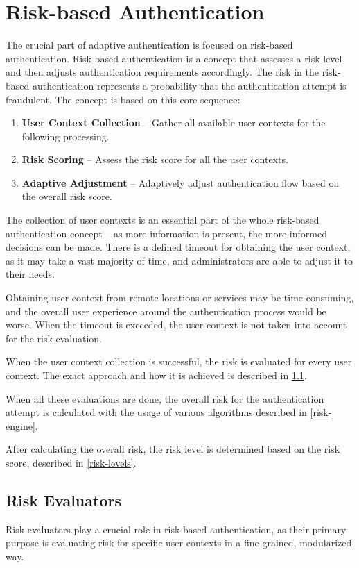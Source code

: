 \section{Risk-based Authentication}
The crucial part of adaptive authentication is focused on risk-based authentication.
Risk-based authentication is a concept that assesses a risk level and then adjusts authentication requirements accordingly.
The risk in the risk-based authentication represents a probability that the authentication attempt is fraudulent.
\newline
\newline
The concept is based on this core sequence:
\begin{enumerate}
    \item \textbf{User Context Collection} -- Gather all available user contexts for the following processing. 
    \item \textbf{Risk Scoring} -- Assess the risk score for all the user contexts. 
    \item \textbf{Adaptive Adjustment} -- Adaptively adjust authentication flow based on the overall risk score.
\end{enumerate}

The collection of user contexts is an essential part of the whole risk-based authentication concept -- as more information is present, the more informed decisions can be made.
There is a defined timeout for obtaining the user context, as it may take a vast majority of time, and administrators are able to adjust it to their needs.

Obtaining user context from remote locations or services may be time-consuming, and the overall user experience around the authentication process would be worse.
When the timeout is exceeded, the user context is not taken into account for the risk evaluation.

When the user context collection is successful, the risk is evaluated for every user context.
The exact approach and how it is achieved is described in \ref{risk-evaluators}.

When all these evaluations are done, the overall risk for the authentication attempt is calculated with the usage of various algorithms described in \ref{risk-engine}.

After calculating the overall risk, the risk level is determined based on the risk score, described in \ref{risk-levels}.

\newpage
\subsection{Risk Evaluators} \label{risk-evaluators}
Risk evaluators play a crucial role in risk-based authentication, as their primary purpose is evaluating risk for specific user contexts in a fine-grained, modularized way.

